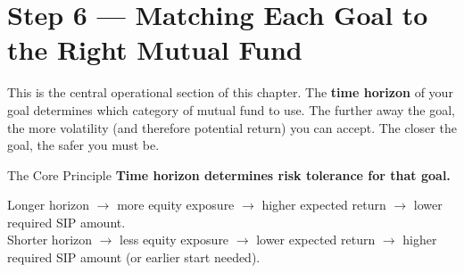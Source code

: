\documentclass[12pt,a4paper]{article}
\begin{document}
\section{Step 6 --- Matching Each Goal to the Right Mutual Fund}

This is the central operational section of this chapter. The \textbf{time horizon} of your goal determines which category of mutual fund to use. The further away the goal, the more volatility (and therefore potential return) you can accept. The closer the goal, the safer you must be.

\begin{conceptbox}{The Core Principle}
\textbf{Time horizon determines risk tolerance for that goal.}

Longer horizon $\longrightarrow$ more equity exposure $\longrightarrow$ higher expected return $\longrightarrow$ lower required SIP amount.\\
Shorter horizon $\longrightarrow$ less equity exposure $\longrightarrow$ lower expected return $\longrightarrow$ higher required SIP amount (or earlier start needed).
\end{conceptbox}

\vspace{3mm}
\end{document}
